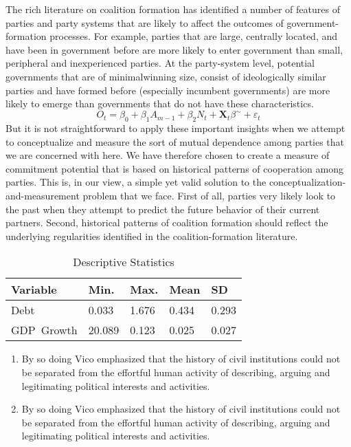\documentclass{cup_PSRM}
\begin{document}
The rich literature on coalition formation has identified a number of features of parties
and party systems that are likely to affect the outcomes of government-formation
processes. For example, parties that
are large, centrally located, and have been in government before are more likely to enter
government than small, peripheral and inexperienced parties. At the party-system level, potential governments that are of minimalwinning
size, consist of ideologically similar parties and have formed before (especially
incumbent governments) are more likely to emerge than governments that do not have
these characteristics.
\begin{equation}
\label{secondstage}
O_t = \beta_0 + \beta_1 A_{m-1} + \beta_2 N_{t} + \textbf{X}_t \beta^{\sim}  + \varepsilon_t
\end{equation}
But it is not straightforward to apply these important insights when we attempt to
conceptualize and measure the sort of mutual dependence among parties that we are
concerned with here. We have therefore chosen to create a measure of commitment
potential that is based on historical patterns of cooperation among parties. This is, in our
view, a simple yet valid solution to the conceptualization-and-measurement problem that
we face. First of all, parties very likely look to the past when they attempt to predict the
future behavior of their current partners. Second, historical patterns of coalition formation
should reflect the underlying regularities identified in the coalition-formation literature.
\begin{table}
\centering
\caption{Descriptive Statistics}
\begin{tabular}{@{}lllll@{}}\\\hline
Variable&Min.&Max.&Mean&SD\\\hline
Debt&0.033&1.676&0.434&0.293\\
GDP~Growth&20.089&0.123&0.025&0.027\\\hline
\end{tabular}
\end{table}

\begin{enumerate}
\item By so doing Vico
emphasized that the history of civil institutions could not be
separated from the effortful human activity of describing, arguing
and legitimating political interests and activities.

\item By so doing Vico
emphasized that the history of civil institutions could not be
separated from the effortful human activity of describing, arguing
and legitimating political interests and activities.
\end{enumerate}
\end{document}
